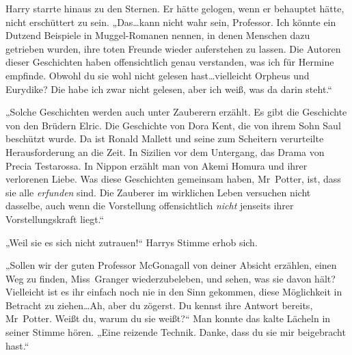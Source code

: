 Harry starrte hinaus zu den Sternen. Er hätte gelogen, wenn er behauptet hätte, nicht erschüttert zu sein. „Das…kann nicht wahr sein, Professor. Ich könnte ein Dutzend Beispiele in Muggel-Romanen nennen, in denen Menschen dazu getrieben wurden, ihre toten Freunde wieder auferstehen zu lassen. Die Autoren dieser Geschichten haben offensichtlich genau verstanden, was ich für Hermine empfinde. Obwohl du sie wohl nicht gelesen hast…vielleicht Orpheus und Eurydike? Die habe ich zwar nicht gelesen, aber ich weiß, was da darin steht.“

„Solche Geschichten werden auch unter Zauberern erzählt. Es gibt die Geschichte von den Brüdern Elric. Die Geschichte von Dora Kent, die von ihrem Sohn Saul beschützt wurde. Da ist Ronald Mallett und seine zum Scheitern verurteilte Herausforderung an die Zeit. In Sizilien vor dem Untergang, das Drama von Precia Testarossa. In Nippon erzählt man von Akemi Homura und ihrer verlorenen Liebe. Was diese Geschichten gemeinsam haben, Mr~Potter, ist, dass sie alle \emph{erfunden} sind. Die Zauberer im wirklichen Leben versuchen nicht dasselbe, auch wenn die Vorstellung offensichtlich \emph{nicht} jenseits ihrer Vorstellungskraft liegt.“

„Weil sie es sich nicht zutrauen!“ Harrys Stimme erhob sich.

„Sollen wir der guten Professor McGonagall von deiner Absicht erzählen, einen Weg zu finden, Miss~Granger wiederzubeleben, und sehen, was sie davon hält? Vielleicht ist es ihr einfach noch nie in den Sinn gekommen, diese Möglichkeit in Betracht zu ziehen…Ah, aber du zögerst. Du kennst ihre Antwort bereits, Mr~Potter. Weißt du, warum du sie weißt?“ Man konnte das kalte Lächeln in seiner Stimme hören. „Eine reizende Technik. Danke, dass du sie mir beigebracht hast.“

